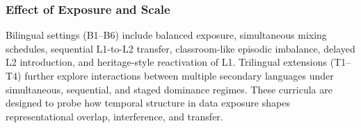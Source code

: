\documentclass[11pt]{article}
\begin{document}
\subsubsection{Effect of Exposure and Scale} 

 Bilingual settings (B1–B6) include balanced exposure, simultaneous mixing schedules, sequential L1-to-L2 transfer, classroom-like episodic imbalance, delayed L2 introduction, and heritage-style reactivation of L1. Trilingual extensions (T1–T4) further explore interactions between multiple secondary languages under simultaneous, sequential, and staged dominance regimes. These curricula are designed to probe how temporal structure in data exposure shapes representational overlap, interference, and transfer.



\end{document}
